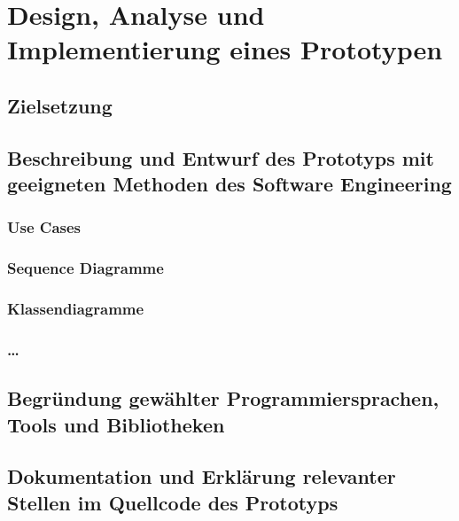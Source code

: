 \chapter{Design, Analyse und Implementierung eines Prototypen}
\label{chapter:prototype}

\section{Zielsetzung}
\section{Beschreibung und Entwurf des Prototyps mit geeigneten Methoden des
Software Engineering}
\subsection{Use Cases}
\subsection{Sequence Diagramme}
\subsection{Klassendiagramme}
\subsection{\dots}
\section{Begründung gewählter Programmiersprachen, Tools und Bibliotheken}
\section{Dokumentation und Erklärung relevanter Stellen im Quellcode des
Prototyps}
